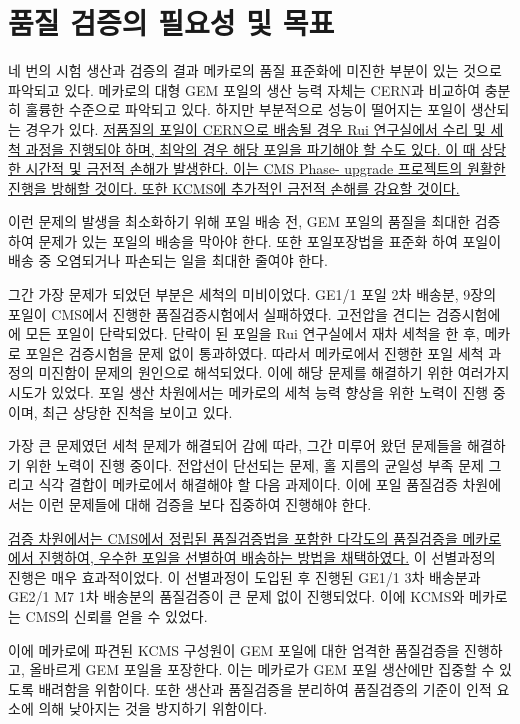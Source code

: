 \section{품질 검증의 필요성 및 목표} 
네 번의 시험 생산과 검증의 결과 메카로의 품질 표준화에 미진한 부분이 있는 것으로 파악되고 있다. 메카로의 대형 GEM 포일의 생산 능력 자체는 CERN과 비교하여 충분히 훌륭한 수준으로 파악되고 있다. 하지만 부분적으로 성능이 떨어지는 포일이 생산되는 경우가 있다. \uline{저품질의 포일이 CERN으로 배송될 경우 Rui 연구실에서 수리 및 세척 과정을 진행되야 하며, 최악의 경우 해당 포일을 파기해야 할 수도 있다. 이 때 상당한 시간적 및 금전적 손해가 발생한다. 이는 CMS Phase- upgrade 프로젝트의 원활한 진행을 방해할 것이다. 또한 KCMS에 추가적인 금전적 손해를 강요할 것이다.}

이런 문제의 발생을 최소화하기 위해 포일 배송 전, GEM 포일의 품질을 최대한 검증하여 문제가 있는 포일의 배송을 막아야 한다. 또한 포일포장법을 표준화 하여 포일이 배송 중 오염되거나 파손되는 일을 최대한 줄여야 한다.

그간 가장 문제가 되었던 부분은 세척의 미비이었다. GE1/1 포일 2차 배송분, 9장의 포일이 CMS에서 진행한 품질검증시험에서 실패하였다. 고전압을 견디는 검증시험에에 모든 포일이 단락되었다. 단락이 된 포일을 Rui 연구실에서 재차 세척을 한 후, 메카로 포일은 검증시험을 문제 없이 통과하였다. 따라서 메카로에서 진행한 포일 세척 과정의 미진함이 문제의 원인으로 해석되었다. 이에 해당 문제를 해결하기 위한 여러가지 시도가 있었다. 포일 생산 차원에서는 메카로의 세척 능력 향상을 위한 노력이 진행 중이며, 최근 상당한 진척을 보이고 있다.

가장 큰 문제였던 세척 문제가 해결되어 감에 따라, 그간 미루어 왔던 문제들을 해결하기 위한 노력이 진행 중이다. 전압선이 단선되는 문제, 홀 지름의 균일성 부족 문제 그리고 식각 결합이 메카로에서 해결해야 할 다음 과제이다. 이에 포일 품질검증 차원에서는 이런 문제들에 대해 검증을 보다 집중하여 진행해야 한다.

\uline{검증 차원에서는 CMS에서 정립된 품질검증법을 포함한 다각도의 품질검증을 메카로에서 진행하여, 우수한 포일을 선별하여 배송하는 방법을 채택하였다.} 이 선별과정의 진행은 매우 효과적이었다. 이 선별과정이 도입된 후 진행된 GE1/1 3차 배송분과 GE2/1 M7 1차 배송분의 품질검증이 큰 문제 없이 진행되었다. 이에 KCMS와 메카로는 CMS의 신뢰를 얻을 수 있었다.

이에 메카로에 파견된 KCMS 구성원이 GEM 포일에 대한 엄격한 품질검증을 진행하고, 올바르게 GEM 포일을 포장한다. 이는 메카로가 GEM 포일 생산에만 집중할 수 있도록 배려함을 위함이다. 또한 생산과 품질검증을 분리하여 품질검증의 기준이 인적 요소에 의해 낮아지는 것을 방지하기 위함이다.
